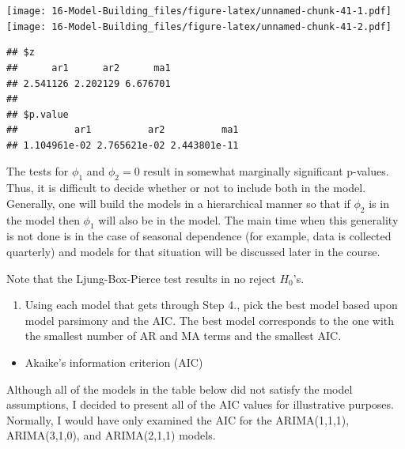 \documentclass[
]{book}
\newenvironment{Shaded}{\begin{snugshade}}{\end{snugshade}}
\newcommand{\AttributeTok}[1]{\textcolor[rgb]{0.77,0.63,0.00}{#1}}
\newcommand{\FunctionTok}[1]{\textcolor[rgb]{0.00,0.00,0.00}{#1}}
\newcommand{\NormalTok}[1]{#1}
\newcommand{\SpecialCharTok}[1]{\textcolor[rgb]{0.00,0.00,0.00}{#1}}
\newcommand{\StringTok}[1]{\textcolor[rgb]{0.31,0.60,0.02}{#1}}
\providecommand{\tightlist}{%
  \setlength{\itemsep}{0pt}\setlength{\parskip}{0pt}}
\theoremstyle{definition}
\theoremstyle{definition}
\theoremstyle{definition}
\theoremstyle{definition}
\theoremstyle{remark}
\begin{document}
\texttt{[image: 16-Model-Building\_files/figure-latex/unnamed-chunk-41-1.pdf]} \texttt{[image: 16-Model-Building\_files/figure-latex/unnamed-chunk-41-2.pdf]}

\begin{verbatim}
## $z
##      ar1      ar2      ma1 
## 2.541126 2.202129 6.676701 
## 
## $p.value
##          ar1          ar2          ma1 
## 1.104961e-02 2.765621e-02 2.443801e-11
\end{verbatim}

The tests for \(\phi_1\) and \(\phi_2 = 0\) result in somewhat marginally significant p-values. Thus, it is difficult to decide whether or not to include both in the model. Generally, one will build the models in a hierarchical manner so that if \(\phi_2\) is in the model then \(\phi_1\) will also be in the model. The main time when this generality is not done is in the case of seasonal dependence (for example, data is collected quarterly) and models for that situation will be discussed later in the course.

Note that the Ljung-Box-Pierce test results in no reject \(H_0\)'s.

\begin{enumerate}
\def\labelenumi{\arabic{enumi}.}
\setcounter{enumi}{4}
\tightlist
\item
  Using each model that gets through Step 4., pick the best model based upon model parsimony and the AIC. The best model corresponds to the one with the smallest number of AR and MA terms and the smallest AIC.
\end{enumerate}

\begin{itemize}
\tightlist
\item
  Akaike's information criterion (AIC)
\end{itemize}

Although all of the models in the table below did not satisfy the model assumptions, I decided to present all of the AIC values for illustrative purposes. Normally, I would have only examined the AIC for the ARIMA(1,1,1), ARIMA(3,1,0), and ARIMA(2,1,1) models.

\begin{Shaded}
\end{Shaded}
\end{document}
